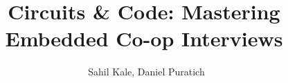 \documentclass[letterpaper,11pt]{article}
\begin{document}

\newpage

\title{Circuits \& Code: Mastering Embedded Co-op Interviews}
\author{\textcopyright \ Sahil Kale, Daniel Puratich}
\setlength{\droptitle}{0.3\textheight} %
\maketitle %
\thispagestyle{empty} %
\newpage

\tableofcontents
\newpage


\newpage


\newpage

\newpage

\newpage

\newpage
\newpage

\newpage

\newpage
\newpage
\newpage
\newpage

\newpage
\newpage

\newpage

\newpage
 
\newpage

\newpage

\newpage

\newpage

\newpage
\newpage


\newpage

\newpage


\newpage

\newpage

\newpage

\newpage

\printbibliography
\end{document}
